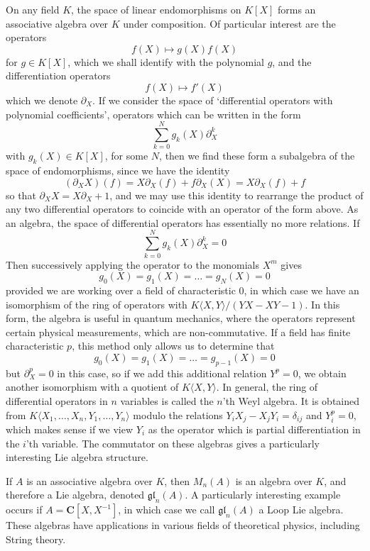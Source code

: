 \begin{example}
    On any field $K$, the space of linear endomorphisms on $K[X]$ forms an associative algebra over $K$ under composition. Of particular interest are the operators
    \[ f(X) \mapsto g(X) f(X) \]
    for $g \in K[X]$, which we shall identify with the polynomial $g$, and the differentiation operators
    \[ f(X) \mapsto f'(X) \]
    which we denote $\partial_X$. If we consider the space of `differential operators with polynomial coefficients', operators which can be written in the form
    \[ \sum_{k = 0}^N g_k(X) \partial_X^k \]
    with $g_k(X) \in K[X]$, for some $N$, then we find these form a subalgebra of the space of endomorphisms, since we have the identity
    \[ (\partial_X X)(f) = X \partial_X(f) + f \partial_X(X) = X \partial_X(f) + f \]
    so that $\partial_X X = X \partial_X + 1$, and we may use this identity to rearrange the product of any two differential operators to coincide with an operator of the form above. As an algebra, the space of differential operators has essentially no more relations. If
    \[ \sum_{k = 0}^N g_k(X) \partial_X^k = 0 \]
    Then successively applying the operator to the monomials $X^m$ gives
    \[ g_0(X) = g_1(X) = \dots = g_N(X) = 0 \]
    provided we are working over a field of characteristic 0, in which case we have an isomorphism of the ring of operators with $K \langle X, Y \rangle / (YX - XY - 1)$. In this form, the algebra is useful in quantum mechanics, where the operators represent certain physical measurements, which are non-commutative. If a field has finite characteristic $p$,  this method only allows us to determine that
    \[ g_0(X) = g_1(X) = \dots = g_{p-1}(X) = 0 \]
    but $\partial_X^p = 0$ in this case, so if we add this additional relation $Y^p = 0$, we obtain another isomorphism with a quotient of $K \langle X, Y \rangle$. In general, the ring of differential operators in $n$ variables is called the $n$'th Weyl algebra. It is obtained from $K\langle X_1, \dots, X_n, Y_1, \dots, Y_n \rangle$ modulo the relations $Y_i X_j - X_j Y_i = \delta_{ij}$ and $Y_i^p = 0$, which makes sense if we view $Y_i$ as the operator which is partial differentiation in the $i$'th variable. The commutator on these algebras gives a particularly interesting Lie algebra structure.
\end{example}

\begin{example}
    If $A$ is an associative algebra over $K$, then $M_n(A)$ is an algebra over $K$, and therefore a Lie algebra, denoted $\mathfrak{gl}_n(A)$. A particularly interesting example occurs if $A = \mathbf{C}[X,X^{-1}]$, in which case we call $\mathfrak{gl}_n(A)$ a Loop Lie algebra. These algebras have applications in various fields of theoretical physics, including String theory.
\end{example}

